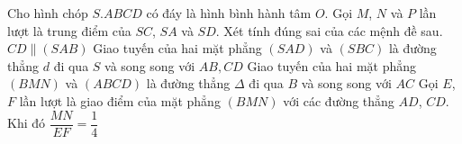 \begin{ex}%
	Cho hình chóp $S.ABCD$ có đáy là hình bình hành tâm $O$. Gọi $M$, $N$ và $P$ lần lượt là trung điểm của $SC$, $SA$ và $SD$. Xét tính đúng sai của các mệnh đề sau.
	\choiceTF
	{\True $CD\parallel (SAB)$}
	{Giao tuyến của hai mặt phẳng $(SAD)$ và $(SBC)$ là đường thẳng $d$ đi qua $S$ và song song với $AB, CD$}
	{\True Giao tuyến của hai mặt phẳng $(BMN)$ và $(ABCD)$ là đường thẳng $\Delta $ đi qua $B$ và song song với $AC$}
	{\True Gọi $E$, $F$ lần lượt là giao điểm của mặt phẳng $(BMN)$ với các đường thẳng $AD$, $CD$. Khi đó $\dfrac{MN}{EF}=\dfrac{1}{4}$}
\end{ex}
